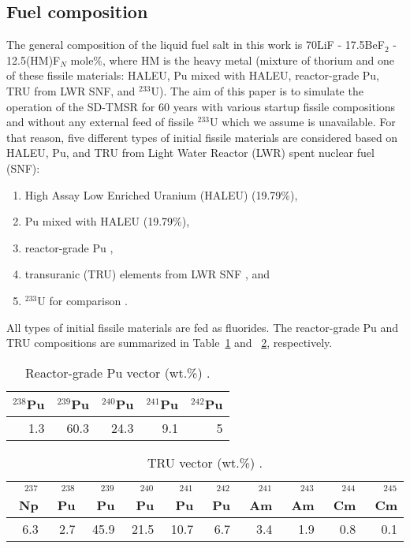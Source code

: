 \subsection{Fuel composition}
The general composition of the liquid fuel salt in this work is 70LiF - 
17.5BeF$_2$ - 12.5(HM)F$_N$ mole\%, where HM is the heavy metal (mixture of 
thorium and one of these fissile materials: \gls{HALEU}, Pu mixed with \gls{HALEU}, reactor-grade Pu, \gls{TRU} from LWR SNF, and $^{233}$U).
The aim of this paper is to simulate the  
operation of the \gls{SD-TMSR} for 60 years with various startup fissile 
compositions and without any external feed of fissile $^{233}$U which we 
assume is unavailable. For that reason, five different types of initial 
fissile materials are considered based on \gls{HALEU}, Pu, and \gls{TRU} from Light Water
Reactor (LWR) spent nuclear fuel (SNF):
\begin{enumerate}[label=(\alph*)]
	\item High Assay Low Enriched Uranium (HALEU) (19.79\%),
	\item Pu mixed with \gls{HALEU} (19.79\%),
	\item reactor-grade Pu \cite{marka1993explosive},
	\item transuranic (TRU) elements from LWR SNF \cite{de2000scenarios}, and
	\item $^{233}$U for comparison \cite{ashraf2019whole_core}.
\end{enumerate}
All types of initial fissile materials are fed as fluorides.
The reactor-grade Pu and \gls{TRU} compositions are summarized in 
Table~\ref{tab:table2} and ~\ref{tab:table3}, respectively.

\begin{table}  %
	\caption{Reactor-grade Pu vector (wt.\%) \cite{marka1993explosive}.}
	\vspace{0.1in}
	\begin{tabularx}{\textwidth}{r r r r r}
		\hline
		$^{238}$Pu & $^{239}$Pu & $^{240}$Pu & $^{241}$Pu & $^{242}$Pu \\
		\hline
		 1.3&60.3&24.3&9.1&5 \\
		\hline
	\end{tabularx}
	\label{tab:table2}
\end{table}

\begin{table}  %
	\caption{\gls{TRU} vector (wt.\%) \cite{de2000scenarios}.}
	\vspace{0.1in}
	\begin{tabularx}{\textwidth}{r r r r r r r r r r}
		\hline
		$^{237}$Np&$^{238}$Pu & $^{239}$Pu & $^{240}$Pu & $^{241}$Pu & $^{242}$Pu&$^{241}$Am &$^{243}$Am&$^{244}$Cm &$^{245}$Cm\\
		\hline
		6.3&2.7&45.9&21.5&10.7&6.7&3.4&1.9&0.8&0.1 \\
		\hline
	\end{tabularx}
	\label{tab:table3}
\end{table}

